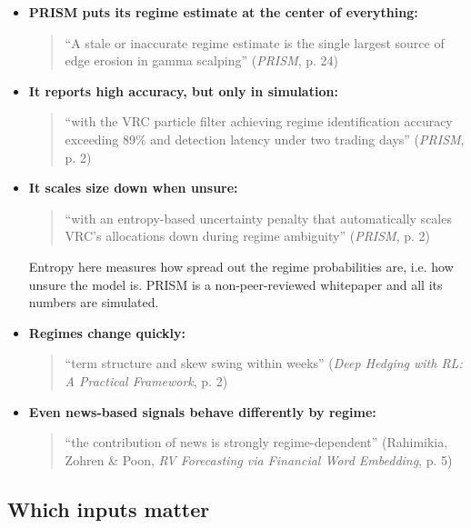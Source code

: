 \documentclass{article}
\begin{document}
\begin{itemize}

\item \textbf{PRISM puts its regime estimate at the center of everything:}

\begin{quote}``A stale or inaccurate regime estimate is the single largest source of edge erosion in gamma scalping'' (\emph{PRISM}, p. 24)\end{quote}

\item \textbf{It reports high accuracy, but only in simulation:}

\begin{quote}``with the VRC particle filter achieving regime identification accuracy exceeding 89\% and detection latency under two trading days'' (\emph{PRISM}, p. 2)\end{quote}

\item \textbf{It scales size down when unsure:}

\begin{quote}``with an entropy-based uncertainty penalty that automatically scales VRC's allocations down during regime ambiguity'' (\emph{PRISM}, p. 2)\end{quote}

Entropy here measures how spread out the regime probabilities are, i.e. how unsure the model is. PRISM is a non-peer-reviewed whitepaper and all its numbers are simulated.

\item \textbf{Regimes change quickly:}

\begin{quote}``term structure and skew swing within weeks'' (\emph{Deep Hedging with RL: A Practical Framework}, p. 2)\end{quote}

\item \textbf{Even news-based signals behave differently by regime:}

\begin{quote}``the contribution of news is strongly regime-dependent'' (Rahimikia, Zohren \& Poon, \emph{RV Forecasting via Financial Word Embedding}, p. 5)\end{quote}

\end{itemize}

\subsection{Which inputs matter}
\end{document}
